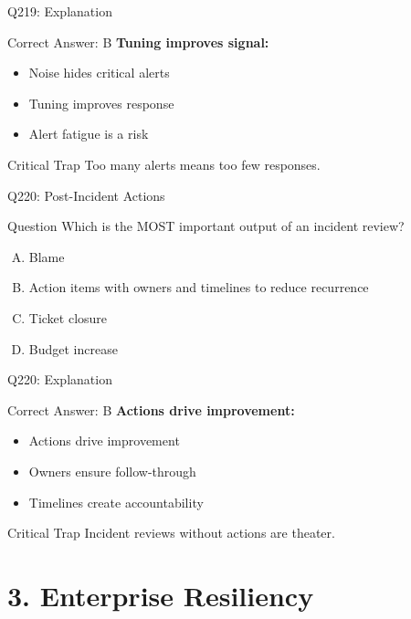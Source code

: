 \documentclass{beamer}
\begin{document}
	\begin{frame}{Q219: Explanation}
		\begin{block}{Correct Answer: B}
			\textbf{Tuning improves signal:}
			\begin{itemize}
				\item Noise hides critical alerts
				\item Tuning improves response
				\item Alert fatigue is a risk
			\end{itemize}
		\end{block}
		\begin{alertblock}{Critical Trap}
			Too many alerts means too few responses.
		\end{alertblock}
	\end{frame}
	
	\begin{frame}{Q220: Post-Incident Actions}
		\begin{block}{Question}
			Which is the MOST important output of an incident review?
		\end{block}
		\begin{enumerate}[(A)]
			\item Blame
			\item Action items with owners and timelines to reduce recurrence
			\item Ticket closure
			\item Budget increase
		\end{enumerate}
	\end{frame}
	
	\begin{frame}{Q220: Explanation}
		\begin{block}{Correct Answer: B}
			\textbf{Actions drive improvement:}
			\begin{itemize}
				\item Actions drive improvement
				\item Owners ensure follow-through
				\item Timelines create accountability
			\end{itemize}
		\end{block}
		\begin{alertblock}{Critical Trap}
			Incident reviews without actions are theater.
		\end{alertblock}
	\end{frame}
	
	\section{3. Enterprise Resiliency}
	
\end{document}
